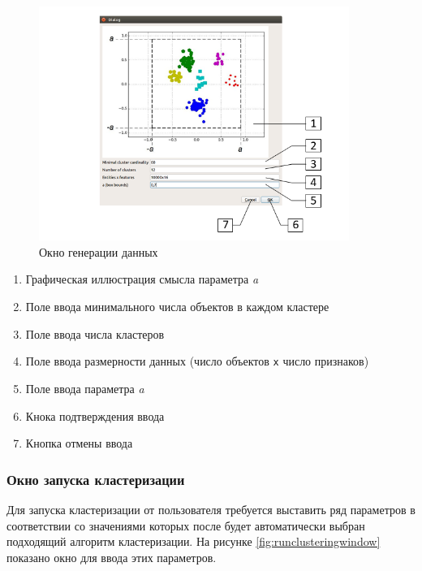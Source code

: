 \documentclass[12pt,twoside,a4paper,tikz,border=5]{refart}
\begin{document}
\begin{figure}[h!]
	\centering
	\includegraphics[width=0.9\textwidth]{img/generationwindow}
	\caption{Окно генерации данных}
	\label{fig:generationwindow}
\end{figure}

\begin{enumerate}
	\item Графическая иллюстрация смысла параметра \textit{a}
	\item Поле ввода минимального числа объектов в каждом кластере
	\item Поле ввода числа кластеров
	\item Поле ввода размерности данных (число объектов \texttt{x} число признаков)
	\item Поле ввода параметра \textit{a}
	\item Кнока подтверждения ввода
	\item Кнопка отмены ввода
\end{enumerate}



\subsubsection{Окно запуска кластеризации}

Для запуска кластеризации от пользователя требуется выставить ряд параметров в соответствии со значениями которых после будет автоматически выбран подходящий алгоритм кластеризации. На рисунке \ref{fig:runclusteringwindow} показано окно для ввода этих параметров.
\end{document}
